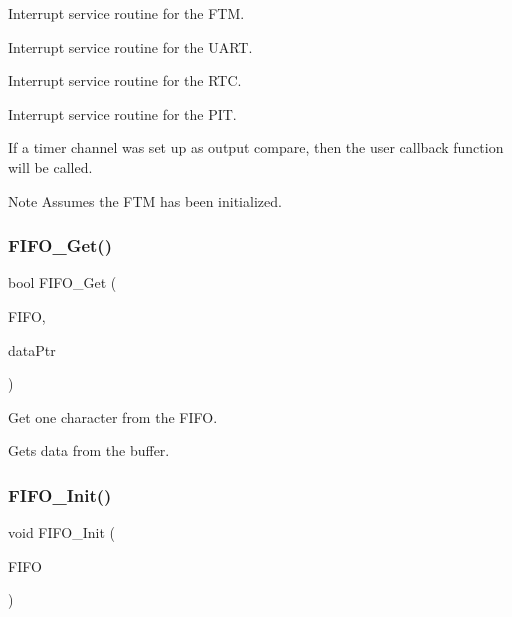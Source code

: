 Interrupt service routine for the F\+TM. 

Interrupt service routine for the U\+A\+RT.

Interrupt service routine for the R\+TC.

Interrupt service routine for the P\+IT.

If a timer channel was set up as output compare, then the user callback function will be called. \begin{DoxyNote}{Note}
Assumes the F\+TM has been initialized. 
\end{DoxyNote}
\mbox{\label{group__main__module_ga6407e3daf24a826a7f17d3e48865e89a}} 
\subsubsection{\texorpdfstring{F\+I\+F\+O\+\_\+\+Get()}{FIFO\_Get()}}
{\footnotesize\ttfamily bool F\+I\+F\+O\+\_\+\+Get (\begin{DoxyParamCaption}\item[{\hyperlink{struct_t_f_i_f_o}{T\+F\+I\+FO} $\ast$const}]{F\+I\+FO,  }\item[{uint8\+\_\+t $\ast$const}]{data\+Ptr }\end{DoxyParamCaption})}



Get one character from the F\+I\+FO. 

Gets data from the buffer. \mbox{\label{group__main__module_gad9207f49ab9ed061b6dca6063112ca60}} 
\subsubsection{\texorpdfstring{F\+I\+F\+O\+\_\+\+Init()}{FIFO\_Init()}}
{\footnotesize\ttfamily void F\+I\+F\+O\+\_\+\+Init (\begin{DoxyParamCaption}\item[{\hyperlink{struct_t_f_i_f_o}{T\+F\+I\+FO} $\ast$const}]{F\+I\+FO }\end{DoxyParamCaption})}



